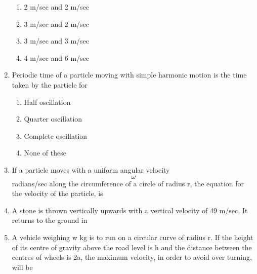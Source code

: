 \documentclass[11pt,a4paper]{article}
\begin{document}
\begin{enumerate}
\begin{enumerate}[label=\Alph*.]
\item{2 m/sec and 2 m/sec}
\item{3 m/sec and 2 m/sec}
\item{3 m/sec and 3 m/sec}
\item{4 m/sec and 6 m/sec}
\end{enumerate}
\item{Periodic time of a particle moving with simple harmonic motion is the time taken by the particle for}
\begin{enumerate}[label=\Alph*.]
\item{Half oscillation}
\item{Quarter oscillation}
\item{Complete oscillation}
\item{None of these}
\end{enumerate}
\item{If a particle moves with a uniform angular velocity $$\omega $$ radians/sec along the circumference of a circle of radius r, the equation for the velocity of the particle, is
}
\\
\item{A stone is thrown vertically upwards with a vertical velocity of 49 m/sec. It returns to the ground in}
\\
\item{A vehicle weighing w kg is to run on a circular curve of radius r. If the height of its centre of gravity above the road level is h and the distance between the centres of wheels is 2a, the maximum velocity, in order to avoid over turning, will be}
\\\begin{enumerate*}[itemjoin=\qquad, label=\Alph*.]

\end{enumerate*}
\end{enumerate}
\end{document}
